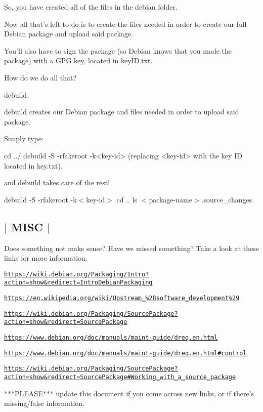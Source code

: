 So, you have created all of the files in the debian folder.

Now all that's left to do is to create the files needed in order to create our full Debian package and upload said package.

You'll also have to sign the package (so Debian knows that you made the package) with a G\-P\-G key, located in key\-I\-D.\-txt.

How do we do all that?

debuild.

debuild creates our Debian package and files needed in order to upload said package.

Simply type\-: \begin{DoxyVerb}cd ../
debuild -S -rfakeroot -k<key-id> (replacing <key-id> with the key ID located in key.txt). 
\end{DoxyVerb}


and debuild takes care of the rest!

debuild -\/\-S -\/rfakeroot -\/k$<$key-\/id$>$ cd .. ls $<$package-\/name$>$.source\-\_\-changes 

 \subsection*{$\vert$ M\-I\-S\-C $\vert$ }

Does something not make sense? Have we missed something? Take a look at these links for more information.

\href{https://wiki.debian.org/Packaging/Intro?action=show&redirect=IntroDebianPackaging}{\tt https\-://wiki.\-debian.\-org/\-Packaging/\-Intro?action=show\&redirect=\-Intro\-Debian\-Packaging}

\href{https://en.wikipedia.org/wiki/Upstream_%28software_development%29}{\tt https\-://en.\-wikipedia.\-org/wiki/\-Upstream\-\_\-\%28software\-\_\-development\%29}

\href{https://wiki.debian.org/Packaging/SourcePackage?action=show&redirect=SourcePackage}{\tt https\-://wiki.\-debian.\-org/\-Packaging/\-Source\-Package?action=show\&redirect=\-Source\-Package}

\href{https://www.debian.org/doc/manuals/maint-guide/dreq.en.html}{\tt https\-://www.\-debian.\-org/doc/manuals/maint-\/guide/dreq.\-en.\-html}

\href{https://www.debian.org/doc/manuals/maint-guide/dreq.en.html#control}{\tt https\-://www.\-debian.\-org/doc/manuals/maint-\/guide/dreq.\-en.\-html\#control}

\href{https://wiki.debian.org/Packaging/SourcePackage?action=show&redirect=SourcePackage#Working_with_a_source_package}{\tt https\-://wiki.\-debian.\-org/\-Packaging/\-Source\-Package?action=show\&redirect=\-Source\-Package\#\-Working\-\_\-with\-\_\-a\-\_\-source\-\_\-package}

$\ast$$\ast$$\ast$\-P\-L\-E\-A\-S\-E$\ast$$\ast$$\ast$ update this document if you come across new links, or if there's missing/false information. 